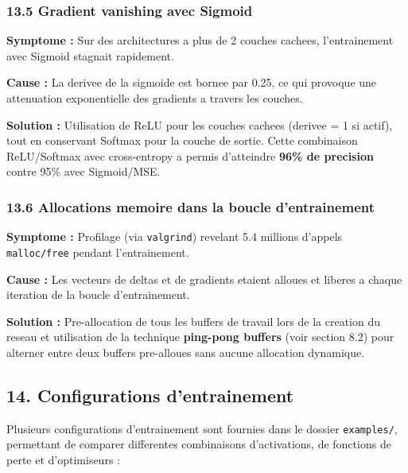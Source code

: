 \documentclass[
  letterpaper,
  DIV=11,
  numbers=noendperiod]{scrartcl}
\begin{document}
\subsubsection{13.5 Gradient vanishing avec Sigmoid}\label{gradient-vanishing}

\textbf{Symptome :} Sur des architectures a plus de 2 couches cachees, l'entrainement avec Sigmoid stagnait rapidement.

\textbf{Cause :} La derivee de la sigmoide est bornee par 0.25, ce qui provoque une attenuation exponentielle des gradients a travers les couches.

\textbf{Solution :} Utilisation de ReLU pour les couches cachees (derivee = 1 si actif), tout en conservant Softmax pour la couche de sortie. Cette combinaison ReLU/Softmax avec cross-entropy a permis d'atteindre \textbf{96\% de precision} contre 95\% avec Sigmoid/MSE.

\subsubsection{13.6 Allocations memoire dans la boucle d'entrainement}\label{allocations-boucle}

\textbf{Symptome :} Profilage (via \texttt{valgrind}) revelant 5.4 millions d'appels \texttt{malloc/free} pendant l'entrainement.

\textbf{Cause :} Les vecteurs de deltas et de gradients etaient alloues et liberes a chaque iteration de la boucle d'entrainement.

\textbf{Solution :} Pre-allocation de tous les buffers de travail lors de la creation du reseau et utilisation de la technique \textbf{ping-pong buffers} (voir section 8.2) pour alterner entre deux buffers pre-alloues sans aucune allocation dynamique.

\subsection{14. Configurations d'entrainement}\label{configurations-entrainement}

Plusieurs configurations d'entrainement sont fournies dans le dossier \texttt{examples/}, permettant de comparer differentes combinaisons d'activations, de fonctions de perte et d'optimiseurs :
\end{document}
